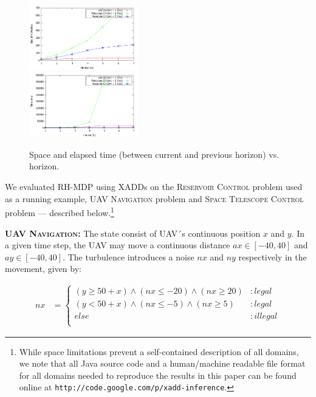\begin{figure}[tbp!]
\vspace{-2mm}
\centering

\includegraphics[width=0.42\textwidth]{Figures/Nodes.pdf}\\
\vspace{-2mm}
\includegraphics[width=0.42\textwidth]{Figures/Time.pdf}

\vspace{-2mm}
\caption{\footnotesize Space and elapsed time (between current and previous horizon) vs. horizon.
}
\label{fig:SpaceTime}
\vspace{-4mm}
\end{figure}

\label{sec:results}

We evaluated RH-MDP using XADDs on the \textsc{Reservoir Control} problem used as a running example,
\textsc{UAV Navigation} problem  and
\textsc{Space Telescope Control} problem --- described below.\footnote{While
space limitations prevent a self-contained
description of all domains, we note that all Java source code and a
human/machine readable file format for all domains needed to reproduce
the results in this paper can be found online at
\texttt{http://code.google.com/p/xadd-inference}.}

{\bf \textsc{UAV Navigation}:} The state consist of UAV´s continuous position $x$ and $y$.
In a given time step, the UAV may move a continuous distance $ax \in [-40,40]$ and $ay \in [-40,40]$. The turbulence introduces a noise $nx$ and $ny$ respectively in the movement, given by:

{\footnotesize
\begin{align*}
nx & = \begin{cases}
(y \geq 50 + x) \wedge (nx \leq -20) \wedge (nx \geq 20) &:legal\\
(y < 50 + x) \wedge (nx \leq -5) \wedge (nx \geq 5) &:legal\\
else &: illegal\\
\end{cases}
\end{align*}}

